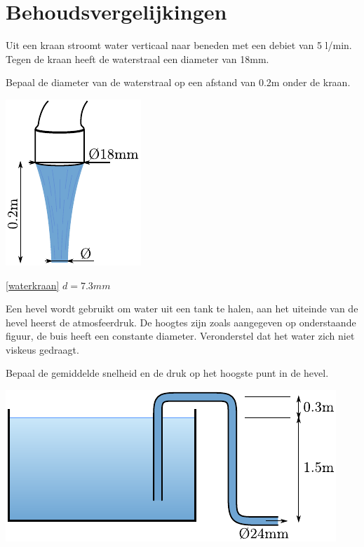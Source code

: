 \chapter{Behoudsvergelijkingen}
\label{sec:Behoudsvergelijkingen}
\begin{toepassing}[*]
	\label{waterkraan}
Uit een kraan stroomt water verticaal naar beneden met een debiet van 5 l/min. Tegen de kraan heeft de waterstraal een diameter van 18mm. 

Bepaal de diameter van de waterstraal op een afstand van 0.2m onder de kraan.

	\centering
	\includegraphics{fig/behoudsvergelijkingen/waterkraan}

\end{toepassing}
\begin{antwoord}{\ref{waterkraan}}
	$d = 7.3\unit{mm}$
\end{antwoord}
\begin{toepassing}[*]
	\label{hevel}
Een hevel wordt gebruikt om water uit een tank te halen, aan het uiteinde van de hevel heerst de atmosfeerdruk. De hoogtes zijn zoals aangegeven op onderstaande figuur, de buis heeft een constante diameter. Veronderstel dat het water zich niet viskeus gedraagt.
		
Bepaal de gemiddelde snelheid en de druk op het hoogste punt in de hevel.

	\centering
	\includegraphics{fig/behoudsvergelijkingen/hevel}

\end{toepassing}
